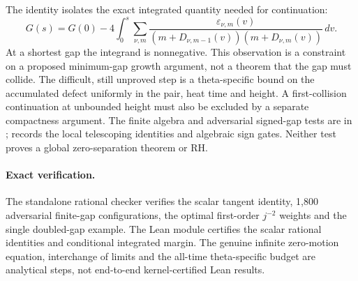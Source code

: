 The identity isolates the exact integrated quantity
needed for continuation:
\[
G(s)=G(0)-4\int_0^s
\sum_{\nu,m}
\frac{\varepsilon_{\nu,m}(v)}
{(m+D_{\nu,m-1}(v))(m+D_{\nu,m}(v))}\,dv .
\]
At a shortest gap the integrand is nonnegative.
This observation is a constraint on a proposed
minimum-gap growth argument, not a theorem that
the gap must collide. The difficult, still unproved
step is a theta-specific bound on the accumulated
defect uniformly in the pair, heat time and height.
A first-collision continuation at unbounded height
must also be excluded by a separate compactness argument.
The finite algebra and adversarial signed-gap
tests are in
;
 records the
local telescoping identities and algebraic sign gates.
Neither test proves a global zero-separation theorem or RH.

\paragraph{Exact verification.}
The standalone rational checker
verifies the scalar tangent identity,
1,800 adversarial finite-gap configurations,
the optimal first-order $j^{-2}$ weights
and the single doubled-gap example.
The Lean module
certifies the scalar rational
identities and conditional integrated
margin. The genuine infinite zero-motion
equation, interchange of limits and the
all-time theta-specific budget are
analytical steps, not end-to-end
kernel-certified Lean results.
